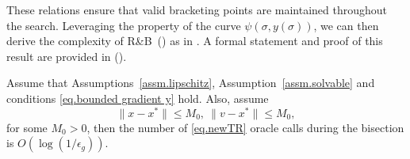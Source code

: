 \documentclass{article}
\begin{document}
These relations ensure that valid bracketing points are maintained throughout the search. Leveraging the property of the curve $\psi(\sigma,y(\sigma))$, we can then derive the complexity of R\&B~() as in . A formal statement and proof of this result are provided in  ().
\begin{lemma}
    \label{lem.complexity bisection}
    Assume that Assumptions~\ref{assm.lipschitz}, Assumption~\ref{assm.solvable} and conditions \eqref{eq.bounded gradient y} hold. Also, assume \begin{equation}\label{eq.bounded assm point main text}
        \|x-x^*\|\leq M_0, \ \|v-x^*\|\leq M_0,
    \end{equation}
    for some $M_0>0$, then the number of \ref{eq.newTR} oracle calls during the bisection is $O\left(\log \left(1/\epsilon_g\right)\right)$.
\end{lemma}
\end{document}
